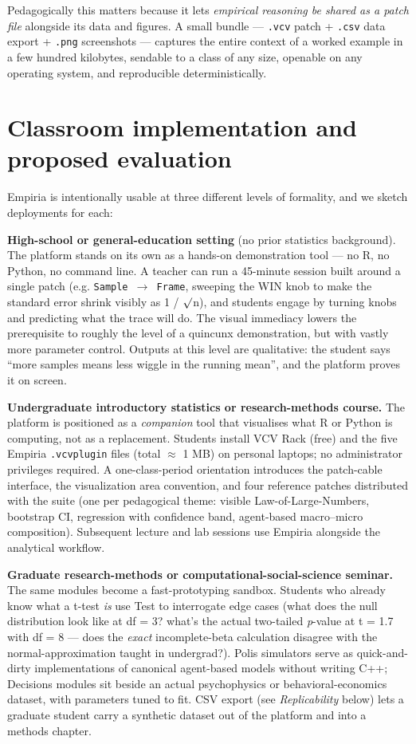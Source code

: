 Pedagogically this matters because it lets \emph{empirical reasoning be
shared as a patch file} alongside its data and figures. A small bundle
--- \texttt{.vcv} patch + \texttt{.csv} data export + \texttt{.png}
screenshots --- captures the entire context of a worked example in a few
hundred kilobytes, sendable to a class of any size, openable on any
operating system, and reproducible deterministically.

\section{Classroom implementation and proposed
evaluation}\label{classroom-implementation-and-proposed-evaluation}

Empiria is intentionally usable at three different levels of formality,
and we sketch deployments for each:

\textbf{High-school or general-education setting} (no prior statistics
background). The platform stands on its own as a hands-on demonstration
tool --- no R, no Python, no command line. A teacher can run a 45-minute
session built around a single patch (e.g. \texttt{Sample\ $\rightarrow$\ Frame},
sweeping the WIN knob to make the standard error shrink visibly as 1 /
\ensuremath{\surd}n), and students engage by turning knobs and predicting what the trace
will do. The visual immediacy lowers the prerequisite to roughly the
level of a quincunx demonstration, but with vastly more parameter
control. Outputs at this level are qualitative: the student says ``more
samples means less wiggle in the running mean'', and the platform proves
it on screen.

\textbf{Undergraduate introductory statistics or research-methods
course.} The platform is positioned as a \emph{companion} tool that
visualises what R or Python is computing, not as a replacement. Students
install VCV Rack (free) and the five Empiria \texttt{.vcvplugin} files
(total \ensuremath{\approx} 1 MB) on personal laptops; no administrator privileges
required. A one-class-period orientation introduces the patch-cable
interface, the visualization area convention, and four reference patches
distributed with the suite (one per pedagogical theme: visible
Law-of-Large-Numbers, bootstrap CI, regression with confidence band,
agent-based macro--micro composition). Subsequent lecture and lab
sessions use Empiria alongside the analytical workflow.

\textbf{Graduate research-methods or computational-social-science
seminar.} The same modules become a fast-prototyping sandbox. Students
who already know what a t-test \emph{is} use Test to interrogate edge
cases (what does the null distribution look like at df = 3? what's the
actual two-tailed \emph{p}-value at t = 1.7 with df = 8 --- does the
\emph{exact} incomplete-beta calculation disagree with the
normal-approximation taught in undergrad?). Polis simulators serve as
quick-and-dirty implementations of canonical agent-based models without
writing C++; Decisions modules sit beside an actual psychophysics or
behavioral-economics dataset, with parameters tuned to fit. CSV export
(see \emph{Replicability} below) lets a graduate student carry a
synthetic dataset out of the platform and into a methods chapter.

